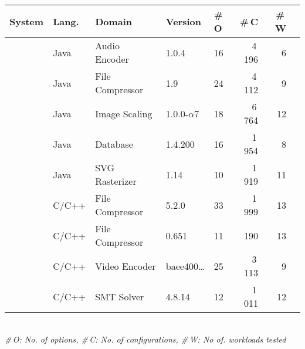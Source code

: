 \begin{tabular}{p{1.1cm}p{0.6cm}p{1.9cm}p{0.99cm}p{0.2cm}rrr}
		\toprule
		\textbf{System} & \textbf{Lang.} & \textbf{Domain} & \textbf{Version} & \textbf{\#\,O} & \textbf{\#\,C} & \textbf{\#\,W}  \\
		
		 
		\midrule
		\jumper & Java & Audio Encoder & 1.0.4 & 16 & 4\,196 & 6   \\
		
		\kanzi &Java  & File Compressor & 1.9 & 24 & 4\,112 & 9 \\
			
		\dconvert & Java & Image Scaling & 1.0.0-$\alpha$7 & 18 & 6\,764 & 12  \\
				
		\htwo & Java & Database & 1.4.200 & 16 & 1\,954  & 8  \\
		
		\batik & Java & SVG Rasterizer & 1.14 & 10 & 1\,919 &  11  \\
		
		
		\midrule
		
		\xz & C/C++ & File Compressor & 5.2.0 & 33 & 1\,999 & 13  \\
		\lrzip & C/C++ & File Compressor & 0.651 & 11 & 190 & 13  \\
		
		\xzwo & C/C++ & Video Encoder & baee400\ldots & 25 & 3\,113 & 9  \\
		\zdrei & C/C++ & SMT Solver & 4.8.14 & 12 & 1\,011 & 12  \\
		
\bottomrule

\end{tabular}\\
{\centering\vspace{1mm}\textit{\#\,O: No. of options, \#\,C: No. of configurations, \#\,W: No of. workloads tested}}

